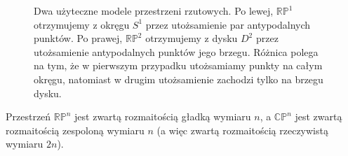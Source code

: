 \begin{figure}[h]
\caption{Dwa użyteczne modele przestrzeni rzutowych.
Po lewej, $\mathbb{RP}^1$ otrzymujemy z okręgu $S^1$ przez utożsamienie
par antypodalnych punktów. Po prawej, $\mathbb{RP}^2$ otrzymujemy z dysku
$D^2$ przez utożsamienie antypodalnych punktów jego brzegu. Różnica polega
na tym, że w pierwszym przypadku utożsamiamy punkty na całym okręgu,
natomiast w drugim utożsamienie zachodzi tylko na brzegu dysku.}
\label{fig:projective-models}
\end{figure}


\begin{twierdzenie}\label{thm:rzutowe-zwarte-1}
Przestrzeń $\mathbb{RP}^n$ jest zwartą rozmaitością gładką wymiaru $n$, a
$\mathbb{CP}^n$ jest zwartą rozmaitością zespoloną wymiaru $n$ (a więc zwartą
rozmaitością rzeczywistą wymiaru $2n$).
\end{twierdzenie}

